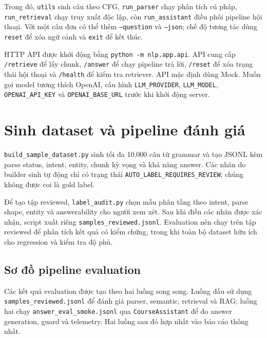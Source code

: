 Trong đó, \texttt{utils} sinh câu theo CFG, \texttt{run\_parser} chạy phân tích cú pháp, \texttt{run\_retrieval} chạy truy xuất độc lập, còn \texttt{run\_assistant} điều phối pipeline hội thoại. Với một câu đơn có thể thêm \texttt{--question} và \texttt{--json}; chế độ tương tác dùng \texttt{reset} để xóa ngữ cảnh và \texttt{exit} để kết thúc.

HTTP API được khởi động bằng \texttt{python -m nlp.app.api}. API cung cấp \texttt{/retrieve} để lấy chunk, \texttt{/answer} để chạy pipeline trả lời, \texttt{/reset} để xóa trạng thái hội thoại và \texttt{/health} để kiểm tra retriever. API mặc định dùng Mock. Muốn gọi model tương thích OpenAI, cấu hình \texttt{LLM\_PROVIDER}, \texttt{LLM\_MODEL}, \texttt{OPENAI\_API\_KEY} và \texttt{OPENAI\_BASE\_URL} trước khi khởi động server.

\section{Sinh dataset và pipeline đánh giá}

\texttt{build\_sample\_dataset.py} sinh tối đa 10.000 câu từ grammar và tạo JSONL kèm parse status, intent, entity, chunk kỳ vọng và khả năng answer. Các nhãn do builder sinh tự động chỉ có trạng thái \texttt{AUTO\_LABEL\_REQUIRES\_REVIEW}; chúng không được coi là gold label.

Để tạo tập reviewed, \texttt{label\_audit.py} chọn mẫu phân tầng theo intent, parse shape, entity và answerability cho người xem xét. Sau khi điền các nhãn được xác nhận, script xuất riêng \texttt{samples\_reviewed.jsonl}. Evaluation nên chạy trên tập reviewed để phân tích kết quả có kiểm chứng, trong khi toàn bộ dataset hữu ích cho regression và kiểm tra độ phủ.

\subsection{Sơ đồ pipeline evaluation}

Các kết quả evaluation được tạo theo hai luồng song song. Luồng đầu sử dụng \texttt{samples\_reviewed.jsonl} để đánh giá parser, semantic, retrieval và RAG; luồng hai chạy \texttt{answer\_eval\_smoke.jsonl} qua \texttt{CourseAssistant} để đo answer generation, guard và telemetry. Hai luồng sau đó hợp nhất vào báo cáo thống nhất.

